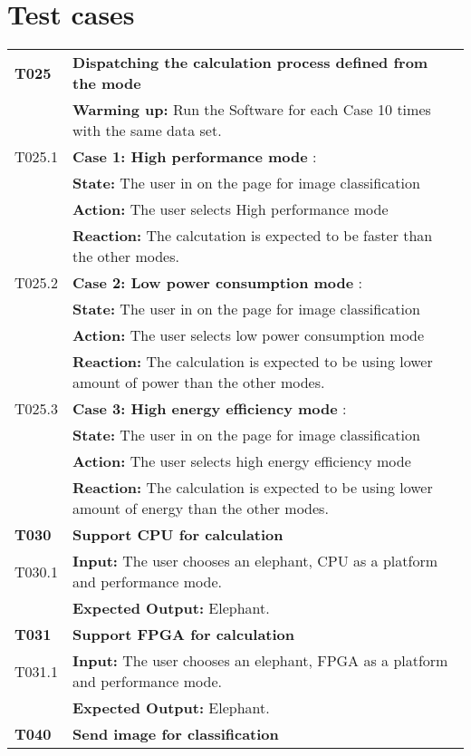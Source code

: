 \documentclass[parskip=full]{scrartcl}
\begin{document}
\section{Test cases}
\begin{tabular}{p{2cm}p{12cm}}
\textbf{T025} & \textbf{Dispatching the calculation process defined from the mode} \\
& \textbf{Warming up:} Run the Software for each Case 10 times with the same data set. \\
T025.1 & \textbf{Case 1: High performance mode} :  \\
& \textbf{State:} The user in on the page for image classification  \\
& \textbf{Action:} The user selects High performance mode  \\
& \textbf{Reaction:} The calcutation is expected to be faster than the other modes. \\ 
T025.2 & \textbf{Case 2: Low power consumption mode} :  \\
& \textbf{State:} The user in on the page for image classification  \\
& \textbf{Action:} The user selects low power consumption mode  \\
& \textbf{Reaction:} The calculation is expected to be using lower amount of power than the other modes. \\
T025.3 & \textbf{Case 3: High energy efficiency mode} :  \\
& \textbf{State:} The user in on the page for image classification  \\
& \textbf{Action:} The user selects high energy efficiency mode  \\
& \textbf{Reaction:} The calculation is expected to be using lower amount of energy than the other modes. \\
\textbf{T030} & \textbf{Support CPU for calculation} \\
T030.1 & \textbf{Input:} The user chooses an elephant, CPU as a platform and performance mode. \\
& \textbf{Expected Output:} Elephant. \\
\textbf{T031} & \textbf{Support FPGA for calculation} \\
T031.1 & \textbf{Input:} The user chooses an elephant, FPGA as a platform and performance mode. \\
& \textbf{Expected Output:} Elephant. \\
\textbf{T040} & \textbf{Send image for classification} \\

\end{tabular}
\end{document}
